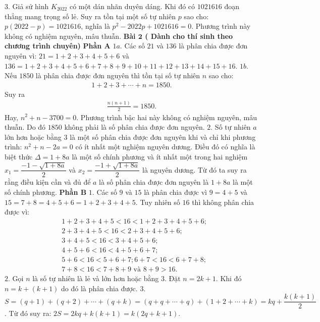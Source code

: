 \begin{multicols}{2}
\vskip 0.05cm
$3.$ Giả sử hình  $K_{2022}$ có một dán nhãn duyên dáng. Khi đó có $1 021 616$ đoạn thẳng mang trọng số lẻ. Suy ra tồn tại một số tự nhiên $p$ sao cho: $p(2022-p)=1 021 616$, nghĩa là $p^2-2022p+1 021 616=0$. Phương trình này không có nghiệm nguyên, mâu thuẫn. 
\vskip 0.05cm
\textbf{\color{cackithi}Bài $\pmb{2}$ ( Dành cho thí sinh theo chương trình chuyên)} 
\vskip 0.05cm
\textbf{\color{cackithi}Phần A}
\vskip 0.05cm
$1a$. Các số $21$ và $136$ là phân chia được đơn nguyên vì: $21=1+2+3+4+5+6$ và $136=1+2+3+4+5+6+7+8+9+10+11+12+13+14+15+16$.
\vskip 0.05cm 
$1b.$ Nếu $1850$ là phân chia được đơn nguyên thì tồn tại số tự nhiên $n$ sao cho: 
\begin{align*}
	1+2+3+\cdots+n=1850.
\end{align*}
Suy ra 
\begin{align*}
	\frac{n(n+1)}{2} = 1850.
\end{align*}
Hay, $n^2+n-3700=0$. Phương trình bậc hai này không có nghiệm nguyên, mâu thuẫn. Do đó $1850$ không phải là số phân chia được đơn nguyên. 
\vskip 0.05cm
$2.$ Số tự nhiên $a$ lớn hơn hoặc bằng $3$ là một số phân chia được đơn nguyên khi và chỉ khi phương trình: $n^2+n-2a=0$ có ít nhất một nghiệm nguyên dương. Điều đó có nghĩa là biệt thức $\Delta=1+8a$ là một số chính phương và ít nhất một trong hai nghiệm \linebreak$x_1=\dfrac{-1-\sqrt{1+ 8a}}{2}$ và $x_2=\dfrac{-1+\sqrt{1+ 8a}}{2}$ là nguyên dương. Từ đó ta suy ra rằng điều kiện cần và đủ để $a$ là số phân chia được đơn nguyên là $1+8a$ là một số chính phương.
\vskip 0.05cm  
\textbf{\color{cackithi}Phần B}
\vskip 0.05cm
$1.$ Các số $9$ và $15$ là phân chia được vì $9=4+5$ và $15=7+8=4+5+6=1+2+3+4+5$. Tuy nhiên số $16$ thì không phân chia được vì:
\begin{align*}
	&1\!+\!2\!+\!3\!+\!4\!+\!5\!<\!16\!<\!1\!+\!2\!+\!3\!+\!4\!+\!5\!+\!6;\\
	&2+3+4+5<16<2+3+4+5+6;\\
	&3+4+5<16<3+4+5+6;\\
	&4+5+6<16<4+5+6+7;\\
	&5\!+\!6\!<\!16\!<\!5\!+\!6\!+\!7; 6\!+\!7\!<\!16\!<\!6\!+\!7\!+\!8;\\
	&7+8<16<7+8+9 \text{ và } 8+9>16.
\end{align*}
$2.$ Gọi $n$ là số tự nhiên là lẻ và lớn hơn hoặc bằng $3$. Đặt $n=2k+1$. Khi đó $n=k+(k+1)$ do đó là phân chia được.
\vskip 0.05cm  
$3.$ $S=(q+1)+(q+2)+\cdots+(q+k)=(q+q+\cdots+q)+(1+2+\cdots+k)=kq+\dfrac{k(k+1)}{2}$.
\vskip 0.05cm
Từ đó suy ra: $2S=2kq+k(k+1)=k(2q+k+1)$. 

\end{multicols}
